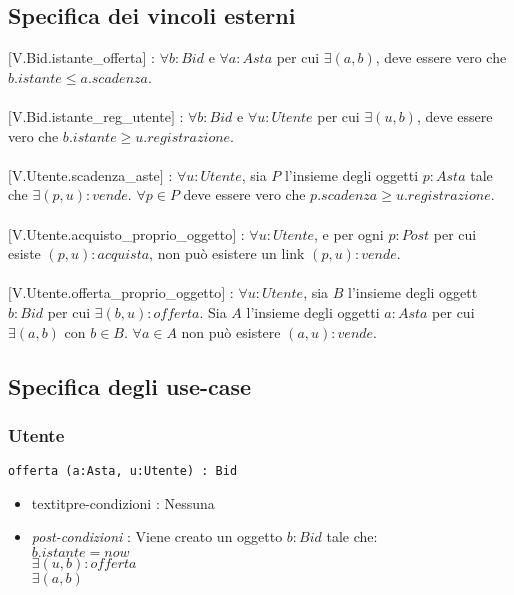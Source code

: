 \documentclass[12pt, letterpaper]{article}
\newcommand{\acc}{\\\hphantom{}\\}
\newcommand{\code}[1]{\colorbox{light-gray}{\texttt{#1}}}
\begin{document}
\subsection{Specifica dei vincoli esterni}
$[$V.Bid.istante\_offerta$]$ : $\forall b:Bid$  e $\forall a:Asta$ per cui $\exists (a,b)$, deve 
essere vero che $b.istante\le a.scadenza$.\acc
$[$V.Bid.istante\_reg\_utente$]$ :  $\forall b:Bid$  e $\forall u:Utente$ per cui $\exists (u,b)$, deve 
essere vero che $b.istante\ge u.registrazione$.\acc
$[$V.Utente.scadenza\_aste$]$ : $\forall u:Utente$, sia $P$ l'insieme degli oggetti $p:Asta$ tale che 
$\exists (p,u):vende$. $\forall p\in P$ deve essere vero che $p.scadenza\ge u.registrazione$.\acc 
$[$V.Utente.acquisto\_proprio\_oggetto$]$ :  $\forall u:Utente$, e per ogni $p:Post$ per cui esiste 
$(p,u):acquista$, non può esistere un link $(p,u):vende$.\acc 
$[$V.Utente.offerta\_proprio\_oggetto$]$ : $\forall u:Utente$, sia $B$ l'insieme degli oggett $b:Bid$ 
per cui $\exists (b,u):offerta$. Sia $A$ l'insieme degli oggetti $a:Asta$ per cui $\exists (a,b)$ con 
$b\in B$. $\forall a\in A$ non può esistere $(a,u):vende$. 
\subsection{Specifica degli use-case}
\subsubsection{Utente}
\code{offerta (a:Asta, u:Utente) :  Bid }\begin{itemize}
    \item textit{pre-condizioni} : Nessuna
    \item \textit{post-condizioni} : Viene creato un oggetto $b:Bid$ tale che:\\ 
     $b.istante=now$ \\
     $\exists (u,b) : offerta$ \\
     $\exists (a,b) $ 
\end{itemize}
\end{document}
